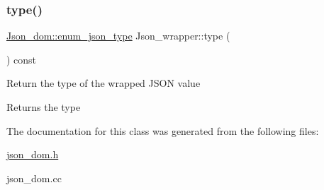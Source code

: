 \subsubsection{\texorpdfstring{type()}{type()}}
{\footnotesize\ttfamily \mbox{\hyperlink{classJson__dom_af37eed7dfe1da1d6507d3ab85320eb03}{Json\+\_\+dom\+::enum\+\_\+json\+\_\+type}} Json\+\_\+wrapper\+::type (\begin{DoxyParamCaption}{ }\end{DoxyParamCaption}) const}

Return the type of the wrapped J\+S\+ON value

\begin{DoxyReturn}{Returns}
the type 
\end{DoxyReturn}


The documentation for this class was generated from the following files\+:\begin{DoxyCompactItemize}
\item 
\mbox{\hyperlink{json__dom_8h}{json\+\_\+dom.\+h}}\item 
json\+\_\+dom.\+cc\end{DoxyCompactItemize}
